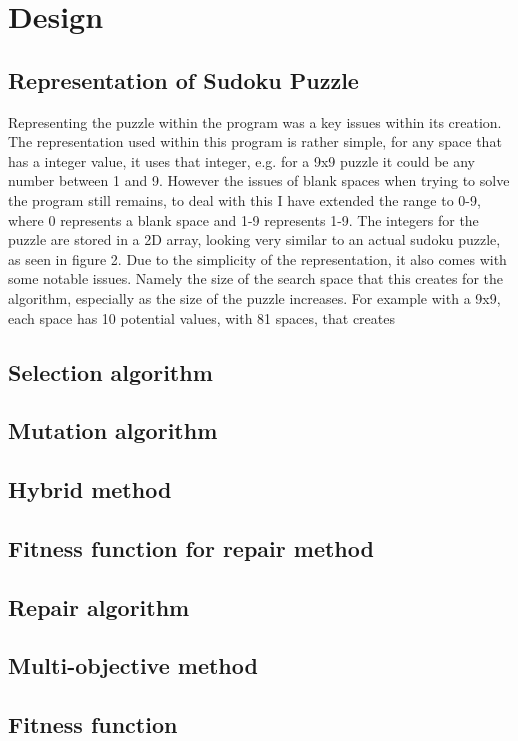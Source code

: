 \documentclass[a4paper,11pt]{article}
\begin{document}
\section{Design}
	
\subsection{Representation of Sudoku Puzzle}
Representing the puzzle within the program was a key issues within its creation. The representation used within this program is rather simple, for any space that has a integer value, it uses that integer, e.g. for a 9x9 puzzle it could be any number between 1 and 9. However the issues of blank spaces when trying to solve the program still remains, to deal with this I have extended the range to 0-9, where 0 represents a blank space and 1-9 represents 1-9. The integers for the puzzle are stored in a 2D array, looking very similar to an actual sudoku puzzle, as seen in figure 2.
Due to the simplicity of the representation, it also comes with some notable issues. Namely the size of the search space that this creates for the algorithm, especially as the size of the puzzle increases. For example with a 9x9, each space has 10 potential values, with 81 spaces, that creates 
\subsection{Selection algorithm}

\subsection{Mutation algorithm}

\subsection{Hybrid method}

\subsection{Fitness function for repair method}

\subsection{Repair algorithm}

\subsection{Multi-objective method}

\subsection{Fitness function}
\end{document}
